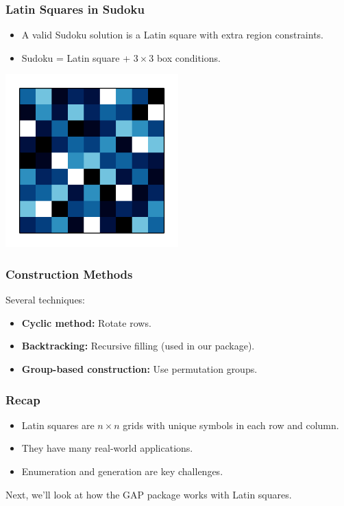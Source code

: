 \documentclass{beamer}
\begin{document}
\begin{frame}
\frametitle{Latin Squares in Sudoku}
\begin{itemize}
  \item A valid Sudoku solution is a Latin square with extra region constraints.
  \item Sudoku = Latin square + $3\times3$ box conditions.
\end{itemize}
\begin{center}
\includegraphics[width=0.5\textwidth]{img1}
\end{center}
\end{frame}

\begin{frame}
\frametitle{Construction Methods}
Several techniques:
\begin{itemize}
  \item \textbf{Cyclic method:} Rotate rows.
  \item \textbf{Backtracking:} Recursive filling (used in our package).
  \item \textbf{Group-based construction:} Use permutation groups.
\end{itemize}
\end{frame}

\begin{frame}
\frametitle{Recap}
\begin{itemize}
  \item Latin squares are $n \times n$ grids with unique symbols in each row and column.
  \item They have many real-world applications.
  \item Enumeration and generation are key challenges.
\end{itemize}
Next, we'll look at how the GAP package works with Latin squares.
\end{frame}
\end{document}

